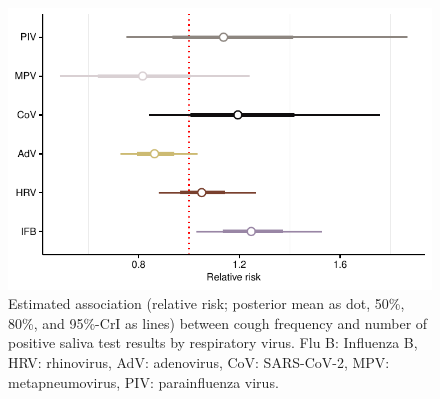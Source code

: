 \documentclass[fleqn,11pt]{wlscirep_supp}
\begin{document}
\begin{figure}[!htpb]
    \centering
    \includegraphics{results/cough-data/coughs-virus-association.pdf}
    \caption[Association between cough frequency and virus-specific positivity rate]{Estimated association (relative risk; posterior mean as dot, 50\%, 80\%, and 95\%-CrI as lines) between cough frequency and number of positive saliva test results by respiratory virus. Flu B: Influenza B, HRV: rhinovirus, AdV: adenovirus, CoV: SARS-CoV-2, MPV: metapneumovirus, PIV: parainfluenza virus.}
    \label{fig:coughing-association}
\end{figure}

\clearpage


\end{document}
